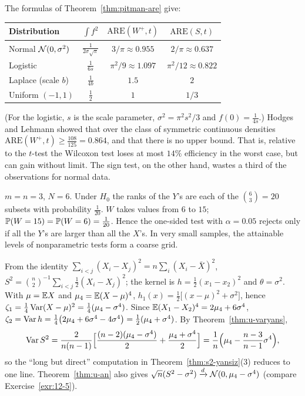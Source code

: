 \documentclass[main.tex]{subfiles}
\begin{document}
\begin{example}\label{ex:are-degerleri}
The formulas of Theorem~\ref{thm:pitman-are} give:
\begin{center}
\begin{tabular}{lccc}
\toprule
Distribution & $\int f^2$ & $\mathrm{ARE}(W^+,t)$ & $\mathrm{ARE}(S,t)$\\
\midrule
Normal $\Normal(0,\sigma^2)$ & $\frac1{2\sigma\sqrt\pi}$ & $3/\pi\approx0.955$ & $2/\pi\approx0.637$\\
Logistic & $\frac1{6s}$ & $\pi^2/9\approx1.097$ & $\pi^2/12\approx0.822$\\
Laplace (scale $b$) & $\frac1{4b}$ & $1.5$ & $2$\\
Uniform $(-1,1)$ & $\frac12$ & $1$ & $1/3$\\
\bottomrule
\end{tabular}
\end{center}
(For the logistic, $s$ is the scale parameter, $\sigma^2=\pi^2s^2/3$ and $f(0)=\frac1{4s}$.) Hodges and Lehmann \cite{hodges-lehmann56} showed that over the class of symmetric continuous densities $\mathrm{ARE}(W^+,t)\ge\frac{108}{125}=0.864$, and that there is no upper bound. That is, relative to the $t$-test the Wilcoxon test loses at most $14\%$ efficiency in the worst case, but can gain without limit. The sign test, on the other hand, wastes a third of the observations for normal data.
\end{example}

\begin{example}\label{ex:mw-kesin}
$m=n=3$, $N=6$. Under $H_0$ the ranks of the $Y$'s are each of the $\binom63=20$ subsets with probability $\frac1{20}$. $W$ takes values from $6$ to $15$; $\P(W=15)=\P(W=6)=\frac1{20}$. Hence the one-sided test with $\alpha=0.05$ rejects only if all the $Y$'s are larger than all the $X$'s. In very small samples, the attainable levels of nonparametric tests form a coarse grid.
\end{example}

\begin{example}[$S^2$ Is a U-Statistic]\label{ex:s2-u}
From the identity $\sum_{i<j}(X_i-X_j)^2=n\sum_i(X_i-\bar X)^2$, $S^2=\binom n2^{-1}\sum_{i<j}\frac12(X_i-X_j)^2$; the kernel is $h=\frac12(x_1-x_2)^2$ and $\theta=\sigma^2$. With $\mu=\E X$ and $\mu_4=\E(X-\mu)^4$, $h_1(x)=\frac12\big[(x-\mu)^2+\sigma^2\big]$, hence $\zeta_1=\frac14\Var(X-\mu)^2=\frac14(\mu_4-\sigma^4)$. Since $\E(X_1-X_2)^4=2\mu_4+6\sigma^4$, $\zeta_2=\Var h=\frac14\big(2\mu_4+6\sigma^4-4\sigma^4\big)=\frac12(\mu_4+\sigma^4)$. By Theorem~\ref{thm:u-varyans},
\[
\Var S^2=\frac{2}{n(n-1)}\Big[\frac{(n-2)(\mu_4-\sigma^4)}{2}+\frac{\mu_4+\sigma^4}{2}\Big]=\frac1n\Big(\mu_4-\frac{n-3}{n-1}\sigma^4\Big),
\]
so the ``long but direct'' computation in Theorem~\ref{thm:s2-yansiz}(3) reduces to one line. Theorem~\ref{thm:u-an} also gives $\sqrt n(S^2-\sigma^2)\dto\Normal(0,\mu_4-\sigma^4)$ (compare Exercise~\ref{exr:12-5}).
\end{example}
\end{document}
